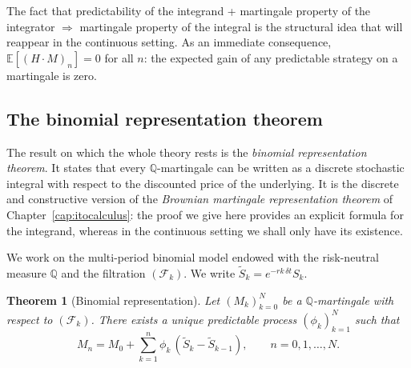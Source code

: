 \documentclass[11pt,a4paper,oneside]{report}
\theoremstyle{plain}
\newtheorem{teorema}{Theorem}[chapter]
\theoremstyle{definition}
\theoremstyle{remark}
\newcommand{\E}{\mathbb{E}}
\newcommand{\Q}{\mathbb{Q}}
\newcommand{\F}{\mathcal{F}}
\newcommand{\1}{\mathbf{1}}
\begin{document}
The fact that predictability of the integrand + martingale property of
the integrator $\Rightarrow$ martingale property of the integral is
the structural idea that will reappear in the continuous setting. As
an immediate consequence, $\E[(H \cdot M)_n] = 0$ for all $n$: the
expected gain of any predictable strategy on a martingale is zero.

\subsection{The binomial representation theorem}
\label{subsec:representacion_binomial}

The result on which the whole theory rests is the
\emph{binomial representation theorem}. It states that
every $\Q$-martingale can be written as a discrete stochastic integral
with respect to the discounted price of the underlying. It is the
discrete and constructive version of the \emph{Brownian martingale
representation theorem} of Chapter~\ref{cap:itocalculus}: the proof
we give here provides an explicit formula for the integrand, whereas
in the continuous setting we shall only have its existence.

We work on the multi-period binomial model endowed with the
risk-neutral measure $\Q$ and the filtration $(\F_k)$. We write
$\widetilde S_k = e^{-r k\, \delta t} S_k$.

\begin{teorema}[Binomial representation]
\label{teo:representacion_binomial}
Let $(M_k)_{k=0}^{N}$ be a $\Q$-martingale with respect to $(\F_k)$.
There exists a unique predictable process $(\phi_k)_{k=1}^N$ such that
\begin{equation}\label{eq:representacion_binomial}
  M_n = M_0 + \sum_{k=1}^{n} \phi_k\, (\widetilde S_k - \widetilde S_{k-1}),
  \qquad n = 0, 1, \ldots, N.
\end{equation}
\end{teorema}
\end{document}
